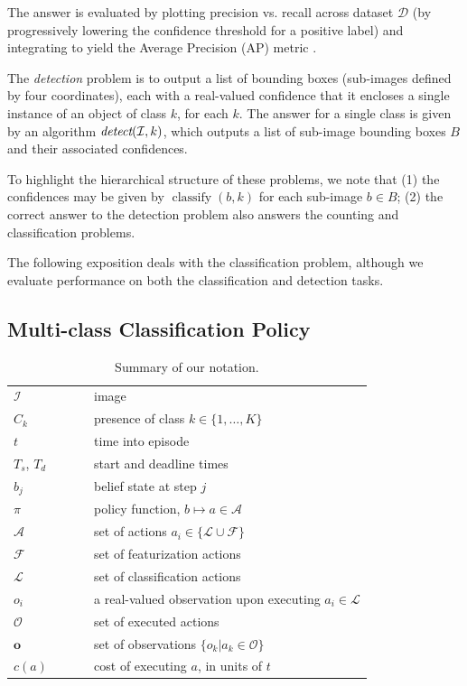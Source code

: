 \documentclass[runningheads]{llncs}
\begin{document}
The answer is evaluated by plotting precision vs. recall across dataset $\mathcal{D}$ (by progressively lowering the confidence threshold for a positive label) and integrating to yield the Average Precision (AP) metric \cite{pascal-voc-2010}.


The \emph{detection} problem is to output a list of bounding boxes (sub-images defined by four coordinates), each with a real-valued confidence that it encloses a single instance of an object of class $k$, for each $k$.
The answer for a single class is given by an algorithm $\emph{detect}(\mathcal{I},k)$, which outputs a list of sub-image bounding boxes $B$ and their associated confidences.

To highlight the hierarchical structure of these problems, we note that (1) the confidences may be given by $\operatorname{classify}(b,k)$ for each sub-image $b \in B$; (2) the correct answer to the detection problem also answers the counting and classification problems.

The following exposition deals with the classification problem, although we evaluate performance on both the classification and detection tasks.

\subsection{Multi-class Classification Policy}

\begin{table}
\centering
\caption{Summary of our notation.}
\label{tab:notation}
\begin{tabular}{|l|l|}
	\hline
	$\mathcal{I}$	&	image \\
	$C_k$         & presence of class $k \in \{1,\dots,K\}$ \\ 
	$t$           & time into episode \\ 
	$T_s$, $T_d$  & start and deadline times \\ 
	$b_j$        	& belief state at step $j$ \\ 
	$\pi$         & policy function, $b \mapsto a \in \mathcal{A}$ \\
	$\mathcal{A}$ & set of actions $a_i \in \{\mathcal{L} \cup \mathcal{F}\}$\\ 
	$\mathcal{F}$ & set of featurization actions \\
	$\mathcal{L}$ & set of classification actions\\
	$o_i$					&	a real-valued observation upon executing $a_i \in \mathcal{L}$\\
	$\mathcal{O}$	& set of executed actions\\
	$\mathbf{o}$	& set of observations $\{o_k | a_k \in \mathcal{O}\}$\\
	$c(a)$				& cost of executing $a$, in units of $t$\\
	\hline
\end{tabular}\end{table}
\end{document}
